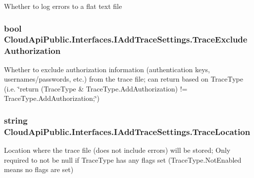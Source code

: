 Whether to log errors to a flat text file 

\hypertarget{interface_cloud_api_public_1_1_interfaces_1_1_i_add_trace_settings_a29cd00532a90fca920517cfb163b0a42}{
\subsubsection[{Trace\-Exclude\-Authorization}]{\setlength{\rightskip}{0pt plus 5cm}bool Cloud\-Api\-Public.\-Interfaces.\-I\-Add\-Trace\-Settings.\-Trace\-Exclude\-Authorization\hspace{0.3cm}{\ttfamily [get]}}}\label{interface_cloud_api_public_1_1_interfaces_1_1_i_add_trace_settings_a29cd00532a90fca920517cfb163b0a42}


Whether to exclude authorization information (authentication keys, usernames/passwords, etc.) from the trace file; can return based on Trace\-Type (i.\-e. \char`\"{}return (\-Trace\-Type \& Trace\-Type.\-Add\-Authorization) != Trace\-Type.\-Add\-Authorization;\char`\"{}) 

\hypertarget{interface_cloud_api_public_1_1_interfaces_1_1_i_add_trace_settings_a5a3de8f9ca58461e90bdaa48538596e3}{
\subsubsection[{Trace\-Location}]{\setlength{\rightskip}{0pt plus 5cm}string Cloud\-Api\-Public.\-Interfaces.\-I\-Add\-Trace\-Settings.\-Trace\-Location\hspace{0.3cm}{\ttfamily [get]}}}\label{interface_cloud_api_public_1_1_interfaces_1_1_i_add_trace_settings_a5a3de8f9ca58461e90bdaa48538596e3}


Location where the trace file (does not include errors) will be stored; Only required to not be null if Trace\-Type has any flags set (Trace\-Type.\-Not\-Enabled means no flags are set) 

